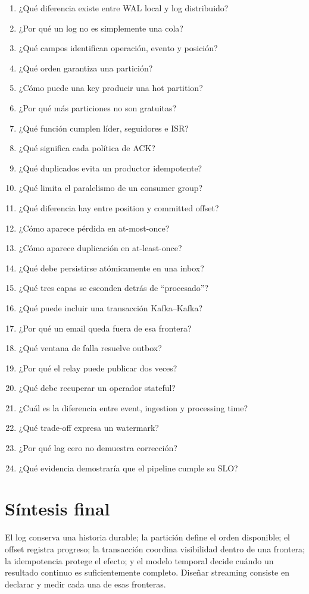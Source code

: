 \documentclass[variant=apuntes,cover=institutional,mode=screen]{ua-engineering-v6-article}
\begin{document}
\begin{enumerate}
\item ¿Qué diferencia existe entre WAL local y log distribuido?
\item ¿Por qué un log no es simplemente una cola?
\item ¿Qué campos identifican operación, evento y posición?
\item ¿Qué orden garantiza una partición?
\item ¿Cómo puede una key producir una hot partition?
\item ¿Por qué más particiones no son gratuitas?
\item ¿Qué función cumplen líder, seguidores e ISR?
\item ¿Qué significa cada política de ACK?
\item ¿Qué duplicados evita un productor idempotente?
\item ¿Qué limita el paralelismo de un consumer group?
\item ¿Qué diferencia hay entre position y committed offset?
\item ¿Cómo aparece pérdida en at-most-once?
\item ¿Cómo aparece duplicación en at-least-once?
\item ¿Qué debe persistirse atómicamente en una inbox?
\item ¿Qué tres capas se esconden detrás de ``procesado''?
\item ¿Qué puede incluir una transacción Kafka--Kafka?
\item ¿Por qué un email queda fuera de esa frontera?
\item ¿Qué ventana de falla resuelve outbox?
\item ¿Por qué el relay puede publicar dos veces?
\item ¿Qué debe recuperar un operador stateful?
\item ¿Cuál es la diferencia entre event, ingestion y processing time?
\item ¿Qué trade-off expresa un watermark?
\item ¿Por qué lag cero no demuestra corrección?
\item ¿Qué evidencia demostraría que el pipeline cumple su SLO?
\end{enumerate}

\section{Síntesis final}

\begin{uakeybox}
El log conserva una historia durable; la partición define el orden disponible; el offset registra progreso; la transacción coordina visibilidad dentro de una frontera; la idempotencia protege el efecto; y el modelo temporal decide cuándo un resultado continuo es suficientemente completo. Diseñar streaming consiste en declarar y medir cada una de esas fronteras.
\end{uakeybox}
\end{document}
